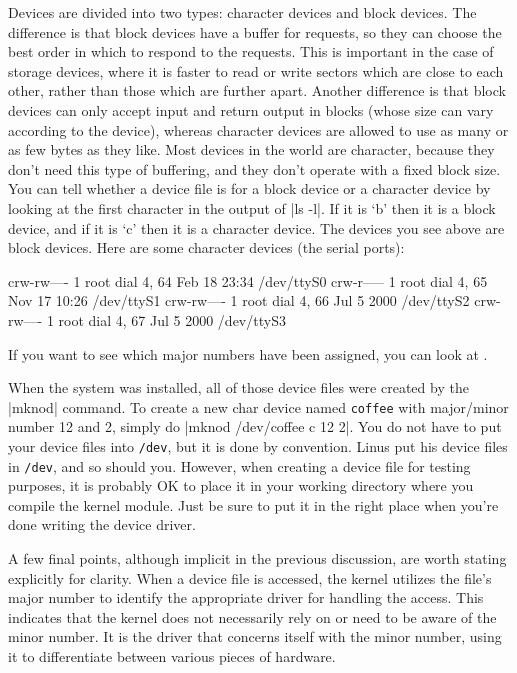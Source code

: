 \documentclass[10pt, oneside]{book}
\begin{document}
Devices are divided into two types: character devices and block devices.
The difference is that block devices have a buffer for requests, so they can choose the best order in which to respond to the requests.
This is important in the case of storage devices, where it is faster to read or write sectors which are close to each other, rather than those which are further apart.
Another difference is that block devices can only accept input and return output in blocks (whose size can vary according to the device), whereas character devices are allowed to use as many or as few bytes as they like.
Most devices in the world are character, because they don't need this type of buffering, and they don't operate with a fixed block size.
You can tell whether a device file is for a block device or a character device by looking at the first character in the output of \sh|ls -l|.
If it is `b' then it is a block device, and if it is `c' then it is a character device.
The devices you see above are block devices. Here are some character devices (the serial ports):

\begin{codebash}
crw-rw----  1 root  dial 4, 64 Feb 18 23:34 /dev/ttyS0
crw-r-----  1 root  dial 4, 65 Nov 17 10:26 /dev/ttyS1
crw-rw----  1 root  dial 4, 66 Jul  5  2000 /dev/ttyS2
crw-rw----  1 root  dial 4, 67 Jul  5  2000 /dev/ttyS3
\end{codebash}

If you want to see which major numbers have been assigned, you can look at .

When the system was installed, all of those device files were created by the \sh|mknod| command.
To create a new char device named \verb|coffee| with major/minor number 12 and 2, simply do \sh|mknod /dev/coffee c 12 2|.
You do not have to put your device files into \verb|/dev|, but it is done by convention.
Linus put his device files in \verb|/dev|, and so should you.
However, when creating a device file for testing purposes, it is probably OK to place it in your working directory where you compile the kernel module.
Just be sure to put it in the right place when you're done writing the device driver.

A few final points, although implicit in the previous discussion, are worth stating explicitly for clarity.
When a device file is accessed, the kernel utilizes the file's major number to identify the appropriate driver for handling the access.
This indicates that the kernel does not necessarily rely on or need to be aware of the minor number.
It is the driver that concerns itself with the minor number, using it to differentiate between various pieces of hardware.
\end{document}
